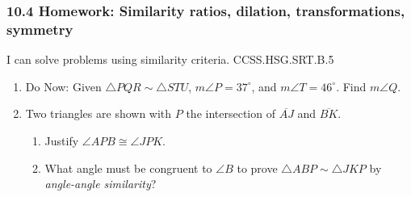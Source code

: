 

\fancyhead[LE]{\thepage}



\subsubsection*{10.4 Homework: Similarity ratios, dilation, transformations, symmetry}
I can solve problems using similarity criteria. \hfill CCSS.HSG.SRT.B.5
  \begin{enumerate}

\item Do Now: Given $\triangle PQR \sim \triangle STU$, $m\angle P=37^\circ$, and $m\angle T=46^\circ$. Find $m\angle Q$. \vspace{4cm}

\item Two triangles are shown with $P$ the intersection of $\overline{AJ}$ and $\overline{BK}$.
\begin{multicols}{2}
  \begin{enumerate}
      \item Justify $\angle APB \cong \angle JPK$.
      \item What angle must be congruent to $\angle B$ to prove $\triangle ABP \sim \triangle JKP$ by \emph{angle-angle similarity}? \vspace{2cm}
      \end{enumerate}
  \end{multicols}
    \vspace{1cm}


\end{enumerate}
